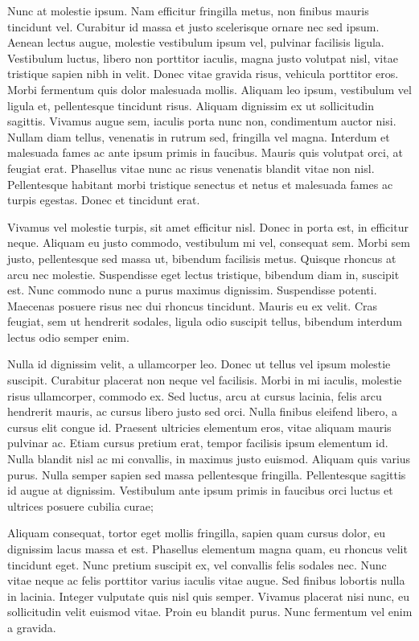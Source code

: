Nunc at molestie ipsum. Nam efficitur fringilla metus, non finibus mauris tincidunt vel. Curabitur id massa et justo scelerisque ornare nec sed ipsum. Aenean lectus augue, molestie vestibulum ipsum vel, pulvinar facilisis ligula. Vestibulum luctus, libero non porttitor iaculis, magna justo volutpat nisl, vitae tristique sapien nibh in velit. Donec vitae gravida risus, vehicula porttitor eros. Morbi fermentum quis dolor malesuada mollis. Aliquam leo ipsum, vestibulum vel ligula et, pellentesque tincidunt risus. Aliquam dignissim ex ut sollicitudin sagittis. Vivamus augue sem, iaculis porta nunc non, condimentum auctor nisi. Nullam diam tellus, venenatis in rutrum sed, fringilla vel magna. Interdum et malesuada fames ac ante ipsum primis in faucibus. Mauris quis volutpat orci, at feugiat erat. Phasellus vitae nunc ac risus venenatis blandit vitae non nisl. Pellentesque habitant morbi tristique senectus et netus et malesuada fames ac turpis egestas. Donec et tincidunt erat.

Vivamus vel molestie turpis, sit amet efficitur nisl. Donec in porta est, in efficitur neque. Aliquam eu justo commodo, vestibulum mi vel, consequat sem. Morbi sem justo, pellentesque sed massa ut, bibendum facilisis metus. Quisque rhoncus at arcu nec molestie. Suspendisse eget lectus tristique, bibendum diam in, suscipit est. Nunc commodo nunc a purus maximus dignissim. Suspendisse potenti. Maecenas posuere risus nec dui rhoncus tincidunt. Mauris eu ex velit. Cras feugiat, sem ut hendrerit sodales, ligula odio suscipit tellus, bibendum interdum lectus odio semper enim.

Nulla id dignissim velit, a ullamcorper leo. Donec ut tellus vel ipsum molestie suscipit. Curabitur placerat non neque vel facilisis. Morbi in mi iaculis, molestie risus ullamcorper, commodo ex. Sed luctus, arcu at cursus lacinia, felis arcu hendrerit mauris, ac cursus libero justo sed orci. Nulla finibus eleifend libero, a cursus elit congue id. Praesent ultricies elementum eros, vitae aliquam mauris pulvinar ac. Etiam cursus pretium erat, tempor facilisis ipsum elementum id. Nulla blandit nisl ac mi convallis, in maximus justo euismod. Aliquam quis varius purus. Nulla semper sapien sed massa pellentesque fringilla. Pellentesque sagittis id augue at dignissim. Vestibulum ante ipsum primis in faucibus orci luctus et ultrices posuere cubilia curae;

Aliquam consequat, tortor eget mollis fringilla, sapien quam cursus dolor, eu dignissim lacus massa et est. Phasellus elementum magna quam, eu rhoncus velit tincidunt eget. Nunc pretium suscipit ex, vel convallis felis sodales nec. Nunc vitae neque ac felis porttitor varius iaculis vitae augue. Sed finibus lobortis nulla in lacinia. Integer vulputate quis nisl quis semper. Vivamus placerat nisi nunc, eu sollicitudin velit euismod vitae. Proin eu blandit purus. Nunc fermentum vel enim a gravida.

